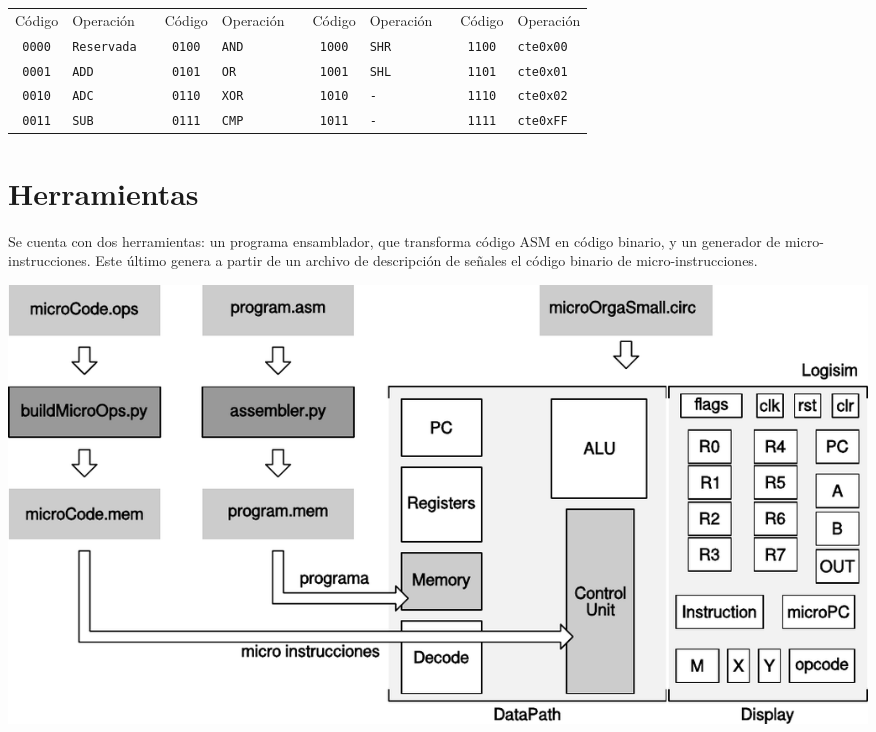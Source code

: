 \documentclass[a4paper,11pt]{article}
\begin{document}
\small
\begin{center}
\begin{tabular}[t]{c|lcc|lcc|lcc|l}
Código        & Operación    & & Código        & Operación    & & Código        & Operación    & & Código        & Operación        \\
\cline{1-2}                      \cline{4-5}                       \cline{7-8}                     \cline{10-11}
\texttt{0000} & \texttt{Reservada}   & & \texttt{0100} & \texttt{AND} & & \texttt{1000} & \texttt{SHR} & & \texttt{1100} & \texttt{cte0x00} \\
\texttt{0001} & \texttt{ADD} & & \texttt{0101} & \texttt{OR}  & & \texttt{1001} & \texttt{SHL} & & \texttt{1101} & \texttt{cte0x01} \\
\texttt{0010} & \texttt{ADC} & & \texttt{0110} & \texttt{XOR} & & \texttt{1010} & \texttt{-}   & & \texttt{1110} & \texttt{cte0x02} \\
\texttt{0011} & \texttt{SUB} & & \texttt{0111} & \texttt{CMP} & & \texttt{1011} & \texttt{-}   & & \texttt{1111} & \texttt{cte0xFF} \\
\end{tabular}
\end{center}
\normalsize

\section*{Herramientas}

Se cuenta con dos herramientas: un programa ensamblador, que transforma código ASM en código binario, y un generador de micro-instrucciones.
Este último genera a partir de un archivo de descripción de señales el código binario de micro-instrucciones.

\begin{center}
\includegraphics[scale=0.6]{img/herramientas.pdf}
\end{center}
\end{document}
